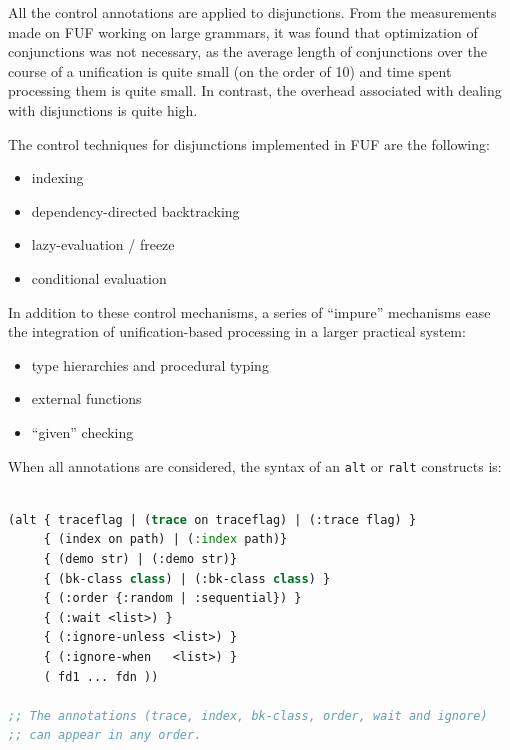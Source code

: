 \documentclass[10pt,a4paper]{report}
\begin{document}
All the control annotations are applied to disjunctions.  From the
measurements made on FUF working on large grammars, it was found that
optimization of conjunctions was not necessary, as the average length of
conjunctions over the course of a unification is quite small (on the order
of 10) and time spent processing them is quite small.  In contrast, the
overhead associated with dealing with disjunctions is quite high.

The control techniques for disjunctions implemented in FUF are the
following:
\begin{itemize}
\item indexing

\item dependency-directed backtracking

\item lazy-evaluation / freeze

\item conditional evaluation
\end{itemize}

In addition to these control mechanisms, a series of ``impure'' mechanisms
ease the integration of unification-based processing in a larger practical
system:
\begin{itemize}
\item type hierarchies and procedural typing

\item external functions

\item ``given'' checking
\end{itemize}

When all annotations are considered,  the syntax of an {\tt alt} or
{\tt ralt} constructs is:

\begin{lstlisting}[language=Lisp]

(alt { traceflag | (trace on traceflag) | (:trace flag) }
     { (index on path) | (:index path)}
     { (demo str) | (:demo str)}
     { (bk-class class) | (:bk-class class) }
     { (:order {:random | :sequential}) }
     { (:wait <list>) }
     { (:ignore-unless <list>) }
     { (:ignore-when   <list>) }
     ( fd1 ... fdn ))

;; The annotations (trace, index, bk-class, order, wait and ignore)
;; can appear in any order.
\end{lstlisting}
\end{document}
